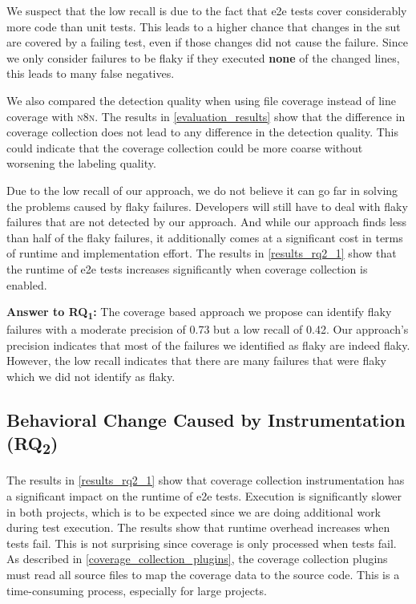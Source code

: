 We suspect that the low recall is due to the fact that \ac{e2e} tests cover considerably more code than unit tests.
This leads to a higher chance that changes in the \ac{sut} are covered by a failing test, even if those changes did not cause the failure.
Since we only consider failures to be flaky if they executed \textbf{none} of the changed lines, this leads to many false negatives.

We also compared the detection quality when using file coverage instead of line coverage with \textsc{n8n}.
The results in \cref{evaluation_results} show that the difference in coverage collection does not lead to any difference in the detection quality.
This could indicate that the coverage collection could be more coarse without worsening the labeling quality.

Due to the low recall of our approach, we do not believe it can go far in solving the problems caused by flaky failures.
Developers will still have to deal with flaky failures that are not detected by our approach.
And while our approach finds less than half of the flaky failures, it additionally comes at a significant cost in terms of runtime and implementation effort.
The results in \cref{results_rq2_1} show that the runtime of \ac{e2e} tests increases significantly when coverage collection is enabled.

\begin{mdframed}
	\textbf{Answer to RQ\textsubscript{1}:} The coverage based approach we propose can identify flaky failures with a moderate precision of \num{0.73} but a low recall of \num{0.42}.
	Our approach's precision indicates that most of the failures we identified as flaky are indeed flaky.
	However, the low recall indicates that there are many failures that were flaky which we did not identify as flaky.
\end{mdframed}

\subsection{Behavioral Change Caused by Instrumentation (\texorpdfstring{RQ\textsubscript{2}}{RQ2})}

The results in \cref{results_rq2_1} show that coverage collection instrumentation has a significant impact on the runtime of \ac{e2e} tests.
Execution is significantly slower in both projects, which is to be expected since we are doing additional work during test execution.
The results show that runtime overhead increases when tests fail.
This is not surprising since coverage is only processed when tests fail.
As described in \cref{coverage_collection_plugins}, the coverage collection plugins must read all source files to map the coverage data to the source code.
This is a time-consuming process, especially for large projects.

